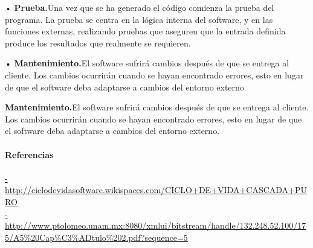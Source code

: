 \documentclass{article}
\begin{document}
• \textbf{Prueba.}Una vez que se ha generado el código comienza la prueba del programa. La prueba se centra en la lógica interna del software, y en las funciones externas, realizando pruebas que aseguren que la entrada definida produce los resultados que realmente se requieren. 

• \textbf{Mantenimiento.}El software sufrirá cambios después de que se entrega al cliente. Los cambios ocurrirán cuando se hayan encontrado errores, esto en lugar de que el software deba adaptarse a cambios del entorno externo


\textbf{Mantenimiento.}El software sufrirá cambios después de que se entrega al cliente. Los cambios ocurrirán cuando se hayan encontrado errores, esto en lugar de que el software deba adaptarse a cambios del entorno externo.
\\ \\

\huge \textbf {Referencias} \\ \\ 
 \large\url{-http://ciclodevidasoftware.wikispaces.com/CICLO+DE+VIDA+CASCADA+PURO}\\
\url{-http://www.ptolomeo.unam.mx:8080/xmlui/bitstream/handle/132.248.52.100/175/A5%20Cap%C3%ADtulo%202.pdf?sequence=5}\\
\end{document}
